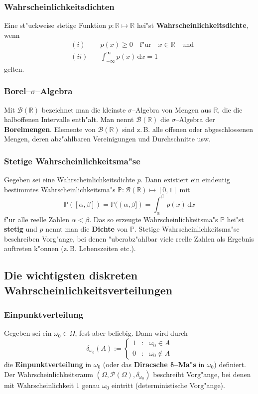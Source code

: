 \documentclass[ngerman,draft,parskip=half,twoside]{scrartcl}
\newcommand*{\R}{\mathbb{R}}      %
\newcommand*{\BorelM}{\mathcal{B}}  %
\newcommand*{\PotM}{\mathcal{P}}    %
\newcommand*{\WKM}{\mathbb{P}}      %
\begin{document}
\subsubsection{Wahrscheinlichkeitsdichten}
Eine st"uckweise stetige Funktion $p\colon\R\mapsto\R$ hei"st
\textbf{Wahrscheinlichkeitsdichte}, wenn
\begin{eqnarray*}
&(i)&\quad p(x)\ge 0\quad\mbox{f"ur}\quad x\in\R\quad \mbox{und}\\
&(ii)&\quad\int_{-\infty}^\infty p(x)\,\mathrm d x=1
\end{eqnarray*}
gelten.
\subsubsection{Borel--$\sigma$--Algebra}
Mit $\BorelM(\R)$ bezeichnet man die kleinste $\sigma$--Algebra von Mengen aus $\R$, die
die halboffenen Intervalle enth"alt. Man nennt $\BorelM(\R)$ die $\sigma$--Algebra der
\textbf{Borelmengen}. Elemente von $\BorelM(\R)$ sind z.\,B. alle offenen oder abgeschlossenen Mengen,
deren abz"ahlbaren Vereinigungen und Durchschnitte usw.
\subsubsection{Stetige Wahrscheinlichkeitsma"se}
Gegeben sei eine Wahrscheinlichkeitsdichte $p$. Dann existiert ein eindeutig bestimmtes
Wahrscheinlichkeitsma"s $\WKM \colon\BorelM(\R)\mapsto [0,1]$ mit
$$
\WKM([\alpha,\beta])=\WKM((\alpha,\beta])=\int_\alpha^\beta\,p(x)\,\mathrm dx
$$
f"ur alle reelle Zahlen $\alpha<\beta$. Das so erzeugte Wahrscheinlichkeitsma"s $\WKM$ hei"st \textbf{stetig}
und $p$ nennt man die \textbf{Dichte} von $\WKM$. Stetige Wahrscheinlichkeitsma"se beschreiben Vorg"ange,
bei denen "uberabz"ahlbar viele reelle Zahlen als Ergebnis auftreten k"onnen (z.\,B. Lebenszeiten etc.).
\subsection{Die wichtigsten diskreten Wahrscheinlichkeitsverteilungen}

\subsubsection{Einpunktverteilung}
Gegeben sei ein $\omega_0\in \Omega$, fest aber beliebig. Dann wird
durch
$$
\delta_{\omega_0}(A):=\left\{
\begin{array}{rcl}
1 &:& \omega_0\in A\\
0 &:& \omega_0\notin A
\end{array}
\right.
$$
die \textbf{Einpunktverteilung} in $\omega_0$ (oder das \textbf{Diracsche $\mathbf \delta$--Ma"s} in
$\omega_0$) definiert. Der Wahrscheinlichkeitsraum $(\Omega,\PotM(\Omega),\delta_{\omega_0})$
beschreibt Vorg"ange, bei denen mit Wahrscheinlichkeit $1$ genau $\omega_0$ eintritt (deterministische
Vorg"ange).
\end{document}

